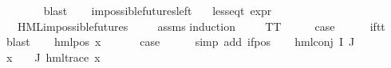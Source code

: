 \begin{isabellebody}
\ \ \ \ \ \ \isamarkupfalse%
\ blast\isanewline
\ \ \isamarkupfalse%
\isanewline
{}\isamarkupfalse%
%
\endisatagproof
{\isafoldproof}%
%
\isadelimproof
\isanewline
%
\endisadelimproof
\isanewline
{}\isamarkupfalse%
\ impossible{\isacharunderscore}{\kern0pt}futures{\isacharunderscore}{\kern0pt}left{\isacharcolon}{\kern0pt}\isanewline
\ \ \ {\isachardoublequoteopen}less{\isacharunderscore}{\kern0pt}eq{\isacharunderscore}{\kern0pt}t\ {\isacharparenleft}{\kern0pt}expr\ {\isasymphi}{\isacharparenright}{\kern0pt}\ {\isacharparenleft}{\kern0pt}{\isasyminfinity}{\isacharcomma}{\kern0pt}\ {}{\isacharcomma}{\kern0pt}\ {}{\isacharcomma}{\kern0pt}\ {}{\isacharcomma}{\kern0pt}\ {\isasyminfinity}{\isacharcomma}{\kern0pt}\ {}{\isacharparenright}{\kern0pt}{\isachardoublequoteclose}\isanewline
\ \ \ {\isachardoublequoteopen}HML{\isacharunderscore}{\kern0pt}impossible{\isacharunderscore}{\kern0pt}futures\ {\isasymphi}{\isachardoublequoteclose}\isanewline
%
\isadelimproof
\ \ %
\endisadelimproof
%
\isatagproof
{}\isamarkupfalse%
\ assms\isanewline
{}\isamarkupfalse%
{\isacharparenleft}{\kern0pt}induction\ {\isasymphi}{\isacharparenright}{\kern0pt}\isanewline
\ \ \isamarkupfalse%
\ TT\isanewline
\ \ \isamarkupfalse%
\ \isamarkupfalse%
\ {\isacharquery}{\kern0pt}case\isanewline
\ \ \ \ \isamarkupfalse%
\ if{\isacharunderscore}{\kern0pt}tt\ \isamarkupfalse%
\ blast\isanewline
{}\isamarkupfalse%
\isanewline
\ \ \isamarkupfalse%
\ {\isacharparenleft}{\kern0pt}hml{\isacharunderscore}{\kern0pt}pos\ x{}\ {\isasymphi}{\isacharparenright}{\kern0pt}\isanewline
\ \ \isamarkupfalse%
\ \isamarkupfalse%
\ {\isacharquery}{\kern0pt}case\isanewline
\ \ \ \ \isamarkupfalse%
\ {\isacharparenleft}{\kern0pt}simp\ add{\isacharcolon}{\kern0pt}\ if{\isacharunderscore}{\kern0pt}pos{\isacharparenright}{\kern0pt}\isanewline
{}\isamarkupfalse%
\isanewline
\ \ \isamarkupfalse%
\ {\isacharparenleft}{\kern0pt}hml{\isacharunderscore}{\kern0pt}conj\ I\ J\ {\isasymPhi}{\isacharparenright}{\kern0pt}\isanewline
\ \ \isamarkupfalse%
\ {\isachardoublequoteopen}{\isasymforall}x\ {\isasymin}\ {\isacharparenleft}{\kern0pt}{\isasymPhi}\ {\isacharbackquote}{\kern0pt}\ J{\isacharparenright}{\kern0pt}{\isachardot}{\kern0pt}\ {\isacharparenleft}{\kern0pt}hml{\isacharunderscore}{\kern0pt}trace\ x{\isacharparenright}{\kern0pt}{\isachardoublequoteclose}\isanewline

\end{isabellebody}
